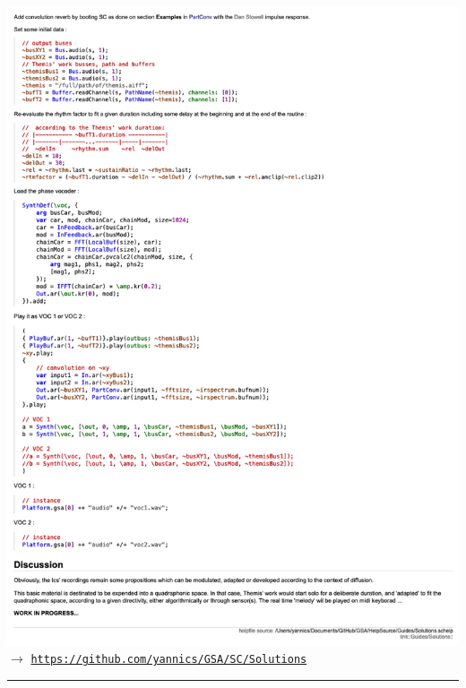 \includegraphics[width=\textwidth]{mp/img/S2}
%
$\rightarrow$ \href{https://github.com/yannics/GSA/SC/Solutions}{\texttt{\small https://github.com/yannics/GSA/SC/Solutions}} 
%
\bigskip
%
\begin{center}\rule{0.5\linewidth}{0.5pt}\end{center}
%
\bigskip

